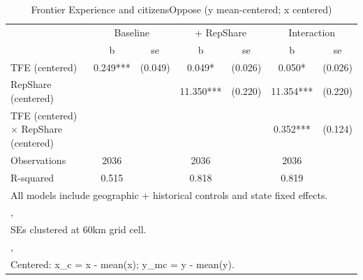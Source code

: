 \begin{table}[htbp]\centering
\def\sym#1{\ifmmode^{#1}\else\(^{#1}\)\fi}
\caption{Frontier Experience and citizensOppose (y mean-centered; x centered)}
\begin{tabular}{l*{3}{cc}}
\toprule
                &\multicolumn{2}{c}{Baseline}&\multicolumn{2}{c}{ + RepShare}&\multicolumn{2}{c}{Interaction}\\
                &        b   &       se&        b   &       se&        b   &       se\\
\midrule
TFE (centered)  &    0.249***&  (0.049)&    0.049*  &  (0.026)&    0.050*  &  (0.026)\\
RepShare (centered)&            &         &   11.350***&  (0.220)&   11.354***&  (0.220)\\
TFE (centered) $\times$ RepShare (centered)&            &         &            &         &    0.352***&  (0.124)\\
\midrule
Observations    &     2036   &         &     2036   &         &     2036   &         \\
R-squared       &    0.515   &         &    0.818   &         &    0.819   &         \\
\bottomrule
\multicolumn{7}{l}{\footnotesize All models include geographic + historical controls and state fixed effects.}\\
\multicolumn{7}{l}{\footnotesize ,}\\
\multicolumn{7}{l}{\footnotesize SEs clustered at 60km grid cell.}\\
\multicolumn{7}{l}{\footnotesize ,}\\
\multicolumn{7}{l}{\footnotesize Centered: x\_c = x - mean(x); y\_mc = y - mean(y).}\\
\end{tabular}
\end{table}
